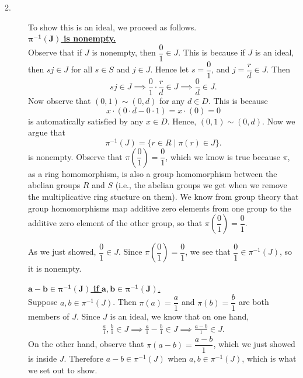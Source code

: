 \documentclass[12pt,letterpaper]{algebra_book}
\theoremstyle{definition}
\begin{document}
\begin{prf}
\begin{description}
        \item[2.]
        To show this is an ideal, we proceed as follows.\\
        \underline{$\bm{\pi^{-1}(J)} $ \textbf{is nonempty.}}\\[1.2ex]
        Observe that if $J$ is nonempty, then $\dfrac{0}{1} \in J$. This
        is because if $J$ is an ideal, then $sj \in J$ for all $s \in
        S$ and $j \in J$. Hence let $s = \dfrac{0}{1}$, and $j = \dfrac{r}{d} \in
        J$. Then 
        \[
            sj \in J \implies \dfrac{0}{1}\cdot \dfrac{r}{d} \in J \implies \frac{0}{d} \in J.  
        \]
        Now observe that $(0, 1) \sim (0, d)$ for any $d \in D$. This is
        because 
        \[
            x \cdot(0 \cdot d - 0 \cdot 1) = x \cdot (0) = 0
        \]
        is automatically satisfied by any $x \in D$.
        Hence, $(0, 1) \sim (0, d)$. Now we argue that
        \[
            \pi^{-1}(J) = \{r \in R \mid \pi(r) \in J\}.
        \]
        is nonempty. Observe that $\pi\left(\dfrac{0}{1}\right) =
        \dfrac{0}{1}$, which we know is true because $\pi$, as a ring
        homomorphism, is also a group homomorphism between the abelian
        groups $R$ and $S$ (i.e., the abelian groups we get when we remove
        the multiplicative ring stucture on them). We know from group theory
        that group homomorphisms map additive zero elements from one group
        to the additive zero element of the other group, so that $\pi\left(\dfrac{0}{1}\right) =
        \dfrac{0}{1}$.
        
        As we just showed, $\dfrac{0}{1} \in J$. Since
        $\pi\left(\dfrac{0}{1}\right) = \dfrac{0}{1}$,
        we see that $\dfrac{0}{1} \in \pi^{-1}(J)$, so it is nonempty. 
    
        \noindent\underline{$\bm{a - b \in \pi^{-1}(J)}$ \textbf{if} $\bm{a, b
        \in \pi^{-1}(J)}$.}\\[1.2ex]
        Suppose $a, b \in \pi^{-1}(J)$. Then $\pi(a) = \dfrac{a}{1}$ and
        $\pi(b) = \dfrac{b}{1}$ are both members of $J$. Since $J$ is an
        ideal, we know that on one hand,
        \begin{align*}
            \frac{a}{1}, \frac{b}{1} \in J \implies \frac{a}{1} - \frac{b}{1} \in J
            \implies \frac{a - b}{1} \in J.
        \end{align*}
        On the other hand, observe that $\pi(a - b) = \dfrac{a - b}{1}$,
        which we just showed is inside $J$. Therefore $a - b \in
        \pi^{-1}(J)$ when $a, b \in \pi^{-1}(J)$, which is what we set out
        to show.
    

\end{description}
\end{prf}
\end{document}
